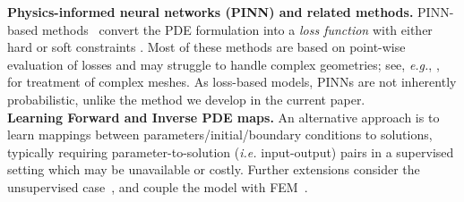 \documentclass[11pt, fleqn]{article}
\begin{document}
\noindent\textbf{Physics-informed neural networks (\gls*{PINN}) and related methods.} \gls*{PINN}-based methods~\cite{raissi2018hidden, raissi2019physics, pang2019fpinns, mao2020physics, karniadakis2021physics, cai2022physics} convert the PDE formulation into a \textit{loss function} with either hard or soft constraints \cite{lu2021physics, wang2021understanding}. Most of these methods are based on point-wise evaluation of losses and may struggle to handle complex geometries; see, \emph{e.g.}, \cite{gao2022physics}, for treatment of complex meshes. As loss-based models, \gls*{PINN}s are not inherently probabilistic, unlike the method we develop in the current paper.\\

\noindent\textbf{Learning Forward and Inverse PDE maps.} An alternative approach is to learn mappings between parameters/initial/boundary conditions to solutions, typically requiring parameter-to-solution (\emph{i.e.} input-output) pairs in a supervised setting \cite{lu2021learning, anandkumar2020neural, bhattacharya2020model, wang2020towards, patel2021physics, kropfl2022operator, zhu2018bayesian} which may be unavailable or costly. Further extensions consider the unsupervised case~\cite{wang2021learning, vadeboncoeur2023random}, and couple the model with \gls*{FEM}~\cite{Yin2022Interfacing}.\\
\end{document}
